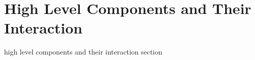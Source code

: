 \documentclass[../../../../dd.tex]{subfiles}
\begin{document}
	\section{High Level Components and Their Interaction}

	high level components and their interaction section
	
\end{document}
